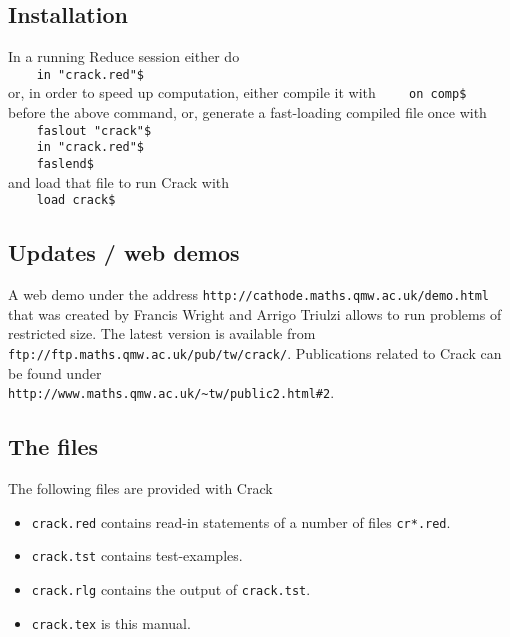\documentclass[12pt]{article}
\begin{document}
\subsection{Installation}
In a running {\sc Reduce} session either do \\
\verb+    in "crack.red"$ + \\
or, in order to speed up computation, either compile it with 
\verb+    on comp$ + \\
before the above command, or, generate a fast-loading compiled 
file once with \\
\verb+    faslout "crack"$ + \\
\verb+    in "crack.red"$ + \\
\verb+    faslend$ + \\
and load that file to run {\sc Crack} with \\
\verb+    load crack$ + 

\subsection{Updates / web demos}
A web demo under the address
\verb+http://cathode.maths.qmw.ac.uk/demo.html+
that was created by Francis Wright and Arrigo Triulzi
allows to run problems of restricted size. 
The latest version is available from \\
\verb+ftp://ftp.maths.qmw.ac.uk/pub/tw/crack/+.
Publications related to {\sc Crack} can be found under  \\
\verb+http://www.maths.qmw.ac.uk/~tw/public2.html#2+.

\subsection{The files}
The following files are provided with {\sc Crack}
\begin{itemize}
\item {\tt crack.red} contains read-in statements of a number
of files {\tt cr*.red}.
\item {\tt crack.tst} contains test-examples.
\item {\tt crack.rlg} contains the output of {\tt crack.tst}.
\item {\tt crack.tex} is this manual.
\end{itemize}
\end{document}
